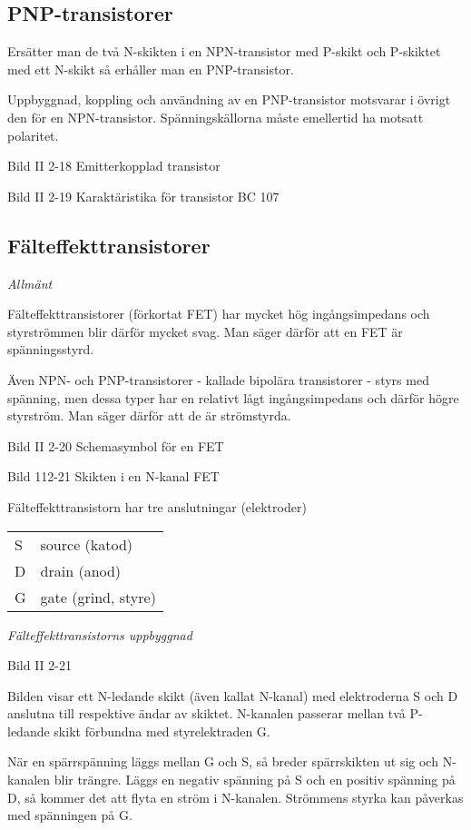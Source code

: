 \subsection{PNP-transistorer}

Ersätter man de två N-skikten i en NPN-transistor med P-skikt och P-skiktet med
ett N-skikt så erhåller man en PNP-transistor.

Uppbyggnad, koppling och användning av en PNP-transistor motsvarar i övrigt den
för en NPN-transistor. Spänningskällorna måste emellertid ha motsatt polaritet.

Bild II 2-18 Emitterkopplad transistor

Bild II 2-19 Karaktäristika för transistor BC 107

\subsection{Fälteffekttransistorer}

\emph{Allmänt}

Fälteffekttransistorer (förkortat FET) har mycket hög ingångsimpedans och
styrströmmen blir därför mycket svag. Man säger därför att en FET är
spänningsstyrd.

Även NPN- och PNP-transistorer - kallade bipolära transistorer - styrs med
spänning, men dessa typer har en relativt lågt ingångsimpedans och därför högre
styrström. Man säger därför att de är strömstyrda.

Bild II 2-20 Schemasymbol för en FET

Bild 112-21 Skikten i en N-kanal FET

Fälteffekttransistorn har tre anslutningar (elektroder)
\begin{tabular}{ll}
  S & source (katod) \\
  D & drain (anod) \\
  G & gate (grind, styre) \\
\end{tabular}

\emph{Fälteffekttransistorns uppbyggnad}

Bild II 2-21

Bilden visar ett N-ledande skikt (även kallat N-kanal) med elektroderna S och D
anslutna till respektive ändar av skiktet. N-kanalen passerar mellan två
P-ledande skikt förbundna med styrelektraden G.

När en spärrspänning läggs mellan G och S, så breder spärrskikten ut sig och
N-kanalen blir trängre. Läggs en negativ spänning på S och en positiv spänning
på D, så kommer det att flyta en ström i N-kanalen. Strömmens styrka kan
påverkas med spänningen på G.


